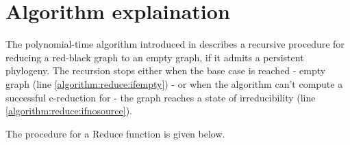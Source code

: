 
\section{Algorithm explaination}\label{section:algorithm}

The polynomial-time algorithm introduced in \cite{PPPptime2016} describes a recursive procedure for reducing a red-black graph to an empty graph, if it admits a persistent phylogeny.
The recursion stops either when the base case is reached - empty graph (line \ref{algorithm:reduce:ifempty}) - or when the algorithm can't compute a successful c-reduction for \grb{} - the graph reaches a state of irreducibility (line \ref{algorithm:reduce:ifnosource}).

The procedure for a Reduce function is given below.

